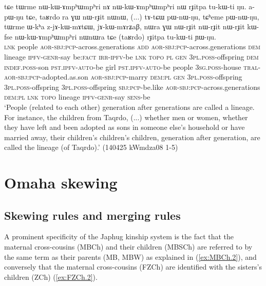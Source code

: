 \begin{exe}
\ex \label{ex:taRrdo.rJitpa}
\gll tɕe tɯrme nɯ-kɯ-ɤmpʰɯmpʰri nɤ nɯ-kɯ-ɤmpʰɯmpʰri nɯ rɟitpa tu-kɯ-ti ŋu. a-pɯ-ŋu tɕe, taʁrdo ra ɣɯ nɯ-rɟit nɯnɯ, (...) tɤ-tɕɯ pɯ-nɯ-ŋu, tɕʰeme pɯ-nɯ-ŋu,  tɯrme ɯ-kʰa z-jɤ-kɯ-mɤtɕɯ, jɤ-kɯ-mɤrʑaβ, nɯra ɣɯ nɯ-rɟit nɯ-rɟit nɯ-rɟit kɯ-fse nɯ-kɯ-ɤmpʰɯmpʰri nɯnɯra tɕe (taʁrdo) rɟitpa tu-kɯ-ti ɲɯ-ŋu. \\
\textsc{lnk} people \textsc{aor}-\textsc{sbj}:\textsc{pcp}-across.generations \textsc{add} \textsc{aor}-\textsc{sbj}:\textsc{pcp}-across.generations \textsc{dem} lineage \textsc{ipfv}-\textsc{genr}-say be:\textsc{fact} \textsc{irr}-\textsc{ipfv}-be \textsc{lnk}  \textsc{topo} \textsc{pl} \textsc{gen} \textsc{3pl}.\textsc{poss}-offspring \textsc{dem} { } \textsc{indef}.\textsc{poss}-son \textsc{pst}.\textsc{ipfv}-\textsc{auto}-be  girl  \textsc{pst}.\textsc{ipfv}-\textsc{auto}-be  people \textsc{3sg}.\textsc{poss}-house \textsc{tral}-\textsc{aor}-\textsc{sbj}:\textsc{pcp}-adopted.as.son \textsc{aor}-\textsc{sbj}:\textsc{pcp}-marry \textsc{dem}:\textsc{pl} \textsc{gen} \textsc{3pl}.\textsc{poss}-offspring  \textsc{3pl}.\textsc{poss}-offspring  \textsc{3pl}.\textsc{poss}-offspring \textsc{sbj}:\textsc{pcp}-be.like  \textsc{aor}-\textsc{sbj}:\textsc{pcp}-across.generations \textsc{dem}:\textsc{pl} \textsc{lnk}  \textsc{topo} lineage \textsc{ipfv}-\textsc{genr}-say \textsc{sens}-be \\
\glt `People (related to each other) generation after generations are called a lineage. For instance, the children from Taqrdo, (...) whether men or women, whether they have left and been adopted as sons in someone else's household or have married away, their children's children's children, generation after generation, are called the lineage (of Taqrdo).' (140425 kWmdza08 1-5)
\end{exe}
 
\section{Omaha skewing} \label{sec:omaha}

\subsection{Skewing rules and merging rules} \label{sec:skewing.merging}
A prominent specificity of the Japhug kinship system is the fact that the maternal cross-cousins (MBCh) and their children (MBSCh)  are referred to by the same term as their parents (MB, MBW) as explained in (\ref{ex:MBCh.2}), and conversely that the maternal cross-cousins (FZCh) are identified with the sisters's children (ZCh) (\ref{ex:FZCh.2}).  

